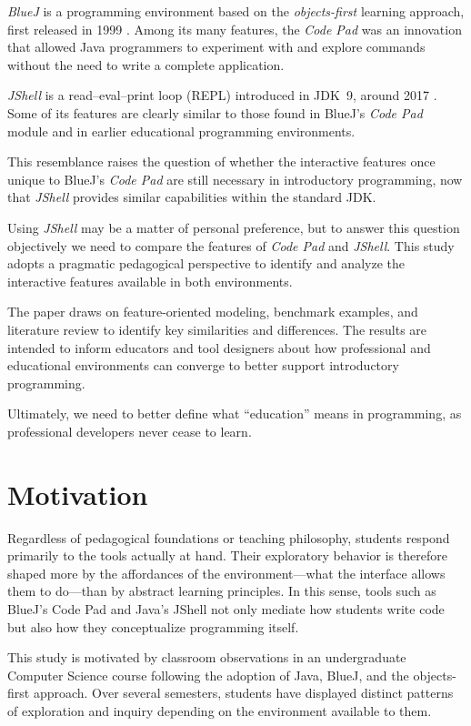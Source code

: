 \documentclass{article}
\begin{document}
\textit{BlueJ} is a programming environment based on the \textit{objects-first} learning approach, first released in 1999 \cite{barnes2008objects, bluej_paper}. Among its many features, the \textit{Code Pad} was an innovation that allowed Java programmers to experiment with and explore commands without the need to write a complete application.

\textit{JShell} is a read–eval–print loop (REPL) introduced in JDK~9, around 2017 \cite{jshell_docs}. Some of its features are clearly similar to those found in BlueJ’s \textit{Code Pad} module and in earlier educational programming environments.

This resemblance raises the question of whether the interactive features once unique to BlueJ’s \textit{Code Pad} are still necessary in introductory programming, now that \textit{JShell} provides similar capabilities within the standard JDK.

Using \textit{JShell} may be a matter of personal preference, but to answer this question objectively we need to compare the features of \textit{Code Pad} and \textit{JShell}. This study adopts a pragmatic pedagogical perspective to identify and analyze the interactive features available in both environments.

The paper draws on feature-oriented modeling, benchmark examples, and literature review to identify key similarities and differences. The results are intended to inform educators and tool designers about how professional and educational environments can converge to better support introductory programming.

Ultimately, we need to better define what “education” means in programming, as professional developers never cease to learn. 

\section{Motivation}

Regardless of pedagogical foundations or teaching philosophy, students respond primarily to the tools actually at hand. Their exploratory behavior is therefore shaped more by the affordances of the environment—what the interface allows them to do—than by abstract learning principles. In this sense, tools such as BlueJ’s Code Pad and Java’s JShell not only mediate how students write code but also how they conceptualize programming itself.

This study is motivated by classroom observations in an undergraduate Computer Science course following the adoption of Java, BlueJ, and the objects-first approach. Over several semesters, students have displayed distinct patterns of exploration and inquiry depending on the environment available to them.
\end{document}
